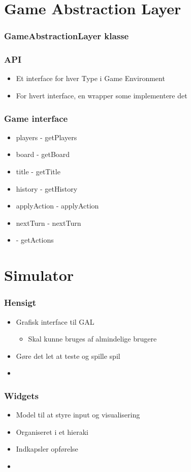 \section{Game Abstraction Layer}


\begin{frame}
  \frametitle{GameAbstractionLayer klasse}

\end{frame}

\begin{frame}
  \frametitle{API}

  \begin{itemize}
    \item Et interface for hver Type i Game Environment
    \item For hvert interface, en wrapper some implementere det
  \end{itemize}
\end{frame}

\begin{frame}
  \frametitle{Game interface}

  \begin{itemize}
    \item players  - getPlayers
	 \item board	-	getBoard
	 \item title - getTitle
	 \item history - getHistory
	 \item applyAction - applyAction
	 \item nextTurn - nextTurn
	 \item  - getActions
  \end{itemize}
\end{frame}

\section{Simulator}

\begin{frame}
  \frametitle{Hensigt}

  \begin{itemize}
    \item Grafisk interface til GAL
	   \begin{itemize}
		  \item Skal kunne bruges af almindelige brugere
	   \end{itemize}
	 \item Gøre det let at teste og spille spil
	 \item 
  \end{itemize}
\end{frame}

\begin{frame}
  \frametitle{Widgets}

  \begin{itemize}
    \item Model til at styre input og visualisering
	 \item Organiseret i et hieraki
	 \item Indkapsler opførelse
	 \item 
  \end{itemize}
\end{frame}

